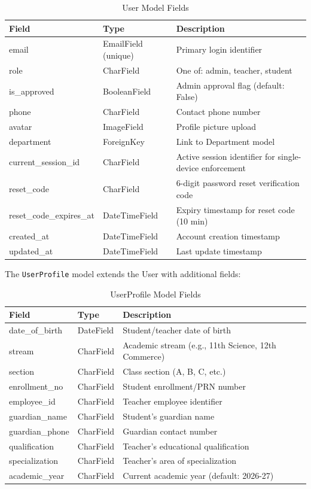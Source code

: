 \begin{table}[H]
\centering
\caption{User Model Fields}
\label{tab:user_model}
\footnotesize
\begin{tabular}{|p{3.5cm}|p{3cm}|p{7cm}|}
\hline
\textbf{Field} & \textbf{Type} & \textbf{Description} \\
\hline
email & EmailField (unique) & Primary login identifier \\
\hline
role & CharField & One of: admin, teacher, student \\
\hline
is\_approved & BooleanField & Admin approval flag (default: False) \\
\hline
phone & CharField & Contact phone number \\
\hline
avatar & ImageField & Profile picture upload \\
\hline
department & ForeignKey & Link to Department model \\
\hline
current\_session\_id & CharField & Active session identifier for single-device enforcement \\
\hline
reset\_code & CharField & 6-digit password reset verification code \\
\hline
reset\_code\_expires\_at & DateTimeField & Expiry timestamp for reset code (10 min) \\
\hline
created\_at & DateTimeField & Account creation timestamp \\
\hline
updated\_at & DateTimeField & Last update timestamp \\
\hline
\end{tabular}
\end{table}

The \texttt{UserProfile} model extends the User with additional fields:

\begin{table}[H]
\centering
\caption{UserProfile Model Fields}
\label{tab:profile_model}
\footnotesize
\begin{tabular}{|p{3.5cm}|p{3cm}|p{7cm}|}
\hline
\textbf{Field} & \textbf{Type} & \textbf{Description} \\
\hline
date\_of\_birth & DateField & Student/teacher date of birth \\
\hline
stream & CharField & Academic stream (e.g., 11th Science, 12th Commerce) \\
\hline
section & CharField & Class section (A, B, C, etc.) \\
\hline
enrollment\_no & CharField & Student enrollment/PRN number \\
\hline
employee\_id & CharField & Teacher employee identifier \\
\hline
guardian\_name & CharField & Student's guardian name \\
\hline
guardian\_phone & CharField & Guardian contact number \\
\hline
qualification & CharField & Teacher's educational qualification \\
\hline
specialization & CharField & Teacher's area of specialization \\
\hline
academic\_year & CharField & Current academic year (default: 2026-27) \\
\hline
\end{tabular}
\end{table}

